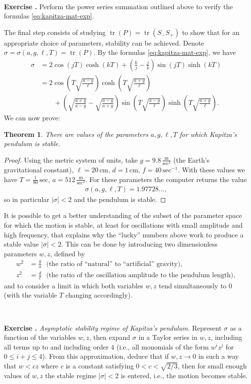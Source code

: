 \documentclass[12pt]{amsart}
\newcommand{\eqst}[1]{\begin{align*}#1\end{align*}}
\newtheorem{thm}{Theorem}
\newcounter{exercise}
\newcommand{\beginexercise}[1]{\ \\ \addtocounter{exercise}{1} \textbf{Exercise \arabic{exercise}.} \textit{#1.}}
\newcommand{\beginexer}{\ \\ \addtocounter{exercise}{1} \textbf{Exercise \arabic{exercise}.} }
\begin{document}
\beginexer Perform the power series summation outlined above to verify the formulas \eqref{eq:kapitza-mat-exp}.

\bigskip
The final step consists of studying $\operatorname{tr}(P)=\operatorname{tr}(S_- S_+)$ to show that for an appropriate choice of parameters, stability can be achieved. Denote
$\sigma = \sigma(a, g, \ell, T) = \operatorname{tr}(P)$.
By the formulas \eqref{eq:kapitza-mat-exp}, we have
\eqst{
\sigma &= 
2\cos\left(jT\right)\cosh\left(kT\right)
+ \left(\frac{k}{j}-\frac{j}{k}\right)
\sin\left(jT\right)\sinh\left(kT\right)
\\ &=
2\cos\left(T\sqrt{\frac{a-g}{\ell}}\right)
\cosh\left(T\sqrt{\frac{a+g}{\ell}}\right)
\\ & \qquad +
\left(\sqrt{\frac{a+g}{a-g}}-\sqrt{\frac{a-g}{a+g}}
\right)
\sin\left(T\sqrt{\frac{a-g}{\ell}}\right)
\sinh\left(T\sqrt{\frac{a+g}{\ell}}\right).
}
We can now prove:

\begin{thm}
There are values of the parameters $a, g, \ell, T$ for which Kapitza's pendulum is stable.
\end{thm}

\begin{proof} Using the metric system of units,
take $g=9.8\,\frac{\textrm{m}}{\textrm{sec}^2}$ (the Earth's gravitational constant),
$\ell = 20\, \textrm{cm}$, $d=1\,\textrm{cm}$, $f=40\,\textrm{sec}^{-1}$. With these values we 
have $T=\frac{1}{80}\,\textrm{sec}$, $a=512\,\frac{\textrm{m}}{\textrm{sec}^2}$.
For these parameters the computer returns the value
\eqst{
\sigma(a, g, \ell, T) = 1.97728\ldots,
}
so in particular $|\sigma|<2$ and the pendulum is stable.
\end{proof}

It is possible to get a better understanding of the subset of the parameter space for which the motion is stable, at least for oscillations with small amplitude and high frequency, that explains why the ``lucky'' numbers above work to produce a stable value $|\sigma|<2$. This can be done by introducing two dimensionless parameters $w,z$, defined by
\eqst{
w^2 &= \frac{g}{a}\ \ \  \textrm{(the ratio of ``natural'' to ``artificial'' gravity)}, \\
z^2 &= \frac{d}{\ell}\ \ \  \textrm{(the ratio of the oscillation amplitude to the pendulum length)},
}
and to consider a limit in which both variables $w,z$ tend simultaneously to $0$ (with the variable $T$ changing accordingly).

\beginexercise{Asymptotic stability regime of Kapitza's pendulum} Represent $\sigma$ as a function of the variables $w, z$, then expand $\sigma$ in a Taylor series in $w,z$, including all terms up to and including order $4$ (i.e., all monomials of the form $w^i z^j$ for $0\le i+j\le 4$). From this approximation, deduce that if $w,z\to 0$ in such a way that $w<cz$ where $c$ is a constant satisfying $0<c<\sqrt{2/3}$, then for small enough values of $w,z$ the stable regime $|\sigma|<2$ is entered, i.e., the motion becomes stable.
\end{document}
